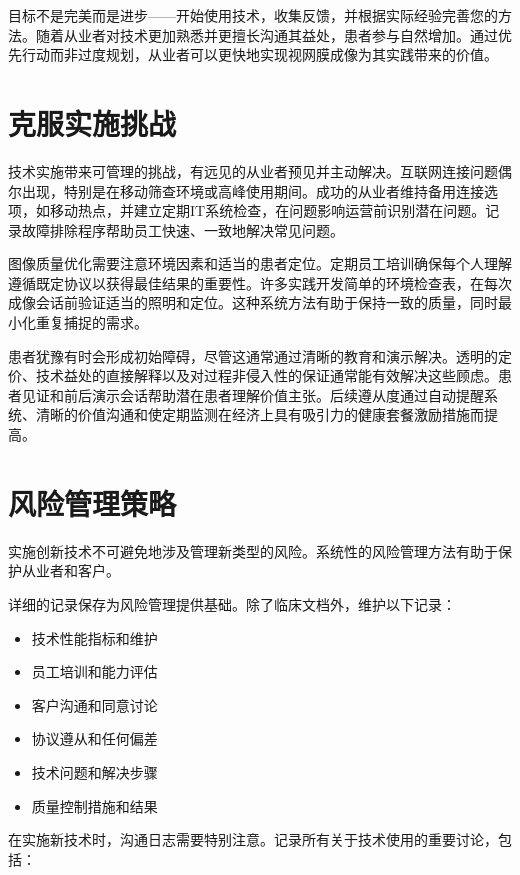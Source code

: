 \documentclass[
  Letterpaper,
]{scrbook}
\providecommand{\tightlist}{%
  \setlength{\itemsep}{0pt}\setlength{\parskip}{0pt}}\usepackage{longtable,booktabs,array}
\begin{document}
目标不是完美而是进步------开始使用技术，收集反馈，并根据实际经验完善您的方法。随着从业者对技术更加熟悉并更擅长沟通其益处，患者参与自然增加。通过优先行动而非过度规划，从业者可以更快地实现视网膜成像为其实践带来的价值。

\section{克服实施挑战}\label{ux514bux670dux5b9eux65bdux6311ux6218}

技术实施带来可管理的挑战，有远见的从业者预见并主动解决。互联网连接问题偶尔出现，特别是在移动筛查环境或高峰使用期间。成功的从业者维持备用连接选项，如移动热点，并建立定期IT系统检查，在问题影响运营前识别潜在问题。记录故障排除程序帮助员工快速、一致地解决常见问题。

图像质量优化需要注意环境因素和适当的患者定位。定期员工培训确保每个人理解遵循既定协议以获得最佳结果的重要性。许多实践开发简单的环境检查表，在每次成像会话前验证适当的照明和定位。这种系统方法有助于保持一致的质量，同时最小化重复捕捉的需求。

患者犹豫有时会形成初始障碍，尽管这通常通过清晰的教育和演示解决。透明的定价、技术益处的直接解释以及对过程非侵入性的保证通常能有效解决这些顾虑。患者见证和前后演示会话帮助潜在患者理解价值主张。后续遵从度通过自动提醒系统、清晰的价值沟通和使定期监测在经济上具有吸引力的健康套餐激励措施而提高。

\section{风险管理策略}\label{ux98ceux9669ux7ba1ux7406ux7b56ux7565}

实施创新技术不可避免地涉及管理新类型的风险。系统性的风险管理方法有助于保护从业者和客户。

详细的记录保存为风险管理提供基础。除了临床文档外，维护以下记录：

\begin{itemize}
\tightlist
\item
  技术性能指标和维护
\item
  员工培训和能力评估
\item
  客户沟通和同意讨论
\item
  协议遵从和任何偏差
\item
  技术问题和解决步骤
\item
  质量控制措施和结果
\end{itemize}

在实施新技术时，沟通日志需要特别注意。记录所有关于技术使用的重要讨论，包括：
\end{document}
